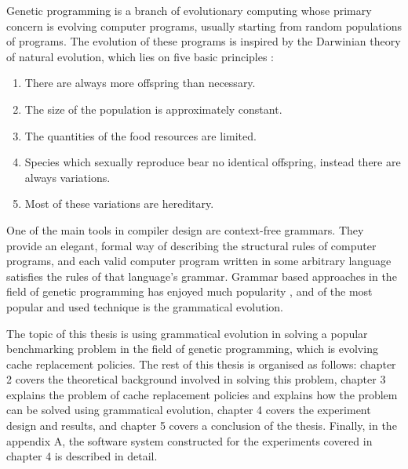 Genetic programming is a branch of evolutionary computing whose primary concern is evolving computer programs, usually starting from random populations of programs. The evolution of these programs is inspired by the Darwinian theory of natural evolution, which lies on five basic principles \citep{cupic2019evolucijskoracunarstvo}:

\begin{enumerate}
	\item There are always more offspring than necessary.
	\item The size of the population is approximately constant.
	\item The quantities of the food resources are limited.
	\item Species which sexually reproduce bear no identical offspring, instead there are always variations.
	\item Most of these variations are hereditary.
\end{enumerate}

One of the main tools in compiler design are context-free grammars. They provide an elegant, formal way of describing the structural rules of computer programs, and each valid computer program written in some arbitrary language satisfies the rules of that language's grammar. Grammar based approaches in the field of genetic programming has enjoyed much popularity \citep{neill2003grammaticalevolution}, and of the most popular and used technique is the grammatical evolution.

The topic of this thesis is using grammatical evolution in solving a popular benchmarking problem in the field of genetic programming, which is evolving cache replacement policies. The rest of this thesis is organised as follows: chapter 2 covers the theoretical background involved in solving this problem, chapter 3 explains the problem of cache replacement policies and explains how the problem can be solved using grammatical evolution, chapter 4 covers the experiment design and results, and chapter 5 covers a conclusion of the thesis. Finally, in the appendix A, the software system constructed for the experiments covered in chapter 4 is described in detail.